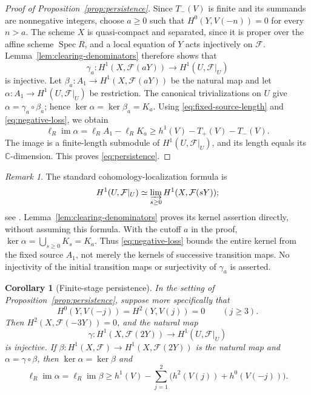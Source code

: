 \documentclass[11pt,reqno]{amsart}
\numberwithin{equation}{section}
\newtheorem{corollary}[theorem]{Corollary}
\theoremstyle{definition}
\theoremstyle{remark}
\newtheorem{remark}[theorem]{Remark}
\newcommand{\C}{\mathbb C}
\newcommand{\FF}{\mathcal F}
\newcommand{\Spec}{\operatorname{Spec}}
\newcommand{\im}{\operatorname{im}}
\newcommand{\len}{\ell}
\begin{document}
\begin{proof}[Proof of Proposition~\ref{prop:persistence}]
Since $T_-(V)$ is finite and its summands are nonnegative integers,
choose $a\geq0$ such that $H^0(Y,V(-n))=0$ for every $n>a$.
The scheme $X$ is quasi-compact and separated, since it is proper
over the affine scheme $\Spec R$, and a local equation of $Y$
acts injectively on $\FF$. Lemma~\ref{lem:clearing-denominators}
therefore shows that
\[
 \gamma_a:H^1(X,\FF(aY))\longrightarrow H^1(U,\FF|_U)
\]
is injective. Let $\beta_a:A_1\to H^1(X,\FF(aY))$ be the natural
map and let $\alpha:A_1\to H^1(U,\FF|_U)$ be restriction. The
canonical trivializations on $U$ give $\alpha=\gamma_a\circ\beta_a$;
hence $\ker\alpha=\ker\beta_a=K_a$. Using
\eqref{eq:fixed-source-length} and \eqref{eq:negative-loss}, we obtain
\[
 \len_R\im\alpha=\len_R A_1-\len_R K_a
 \geq h^1(V)-T_+(V)-T_-(V).
\]
The image is a finite-length submodule of $H^1(U,\FF|_U)$, and its
length equals its $\C$-dimension. This proves \eqref{eq:persistence}.
\end{proof}

\begin{remark}\label{rem:fixed-source}
The standard cohomology-localization formula is
\begin{equation}\label{eq:cohomology-colimit}
 H^1(U,\FF|_U)\simeq\varinjlim_{s\geq0}H^1(X,\FF(sY));
\end{equation}
see \cite[Tag 09MR]{Stacks}. Lemma~\ref{lem:clearing-denominators}
proves its kernel assertion directly, without assuming this formula.
With the cutoff $a$ in the proof, $\ker\alpha=\bigcup_{s\geq0}K_s=K_a$.
Thus \eqref{eq:negative-loss} bounds the entire kernel from the fixed
source $A_1$, not merely the kernels of successive transition maps.
No injectivity of the initial transition maps or surjectivity of
$\gamma_a$ is asserted.
\end{remark}

\begin{corollary}[Finite-stage persistence]\label{cor:finite-stage}
In the setting of Proposition~\ref{prop:persistence}, suppose more
specifically that
\[
 H^0(Y,V(-j))=H^2(Y,V(j))=0\qquad(j\geq3).
\]
Then $H^2(X,\FF(-3Y))=0$, and the natural map
\begin{equation}\label{eq:finite-stage-injection}
 \gamma:H^1(X,\FF(2Y))\longrightarrow H^1(U,\FF|_U)
\end{equation}
is injective. If
$\beta:H^1(X,\FF)\to H^1(X,\FF(2Y))$ is the natural map and
$\alpha=\gamma\circ\beta$, then $\ker\alpha=\ker\beta$ and
\begin{equation}\label{eq:finite-stage-bound}
 \len_R\im\alpha=\len_R\im\beta
 \geq h^1(V)-\sum_{j=1}^{2}\bigl(h^2(V(j))+h^0(V(-j))\bigr).
\end{equation}
\end{corollary}
\end{document}
